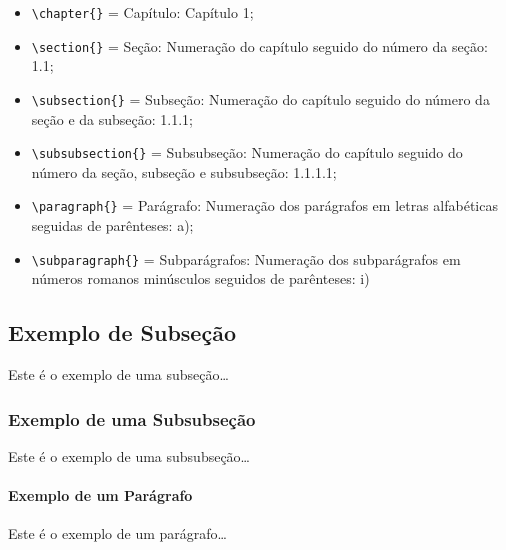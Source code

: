 \begin{itemize}
    \item \verb|\chapter{}| = Capítulo: Capítulo 1;
    \item \verb|\section{}| = Seção: Numeração do capítulo seguido do número da seção: 1.1;
    \item \verb|\subsection{}| = Subseção: Numeração do capítulo seguido do número da seção e da subseção: 1.1.1;
    \item \verb|\subsubsection{}| = Subsubseção: Numeração do capítulo seguido do número da seção, subseção e subsubseção: 1.1.1.1;
    \item \verb|\paragraph{}| = Parágrafo: Numeração dos parágrafos em letras alfabéticas seguidas de parênteses: a);
    \item \verb|\subparagraph{}| = Subparágrafos: Numeração dos subparágrafos em números romanos minúsculos seguidos de parênteses: i)
\end{itemize}

\subsection{Exemplo de Subseção}
Este é o exemplo de uma subseção\ldots

\subsubsection{Exemplo de uma Subsubseção}
Este é o exemplo de uma subsubseção\ldots

\paragraph{Exemplo de um Parágrafo}
Este é o exemplo de um parágrafo\ldots

